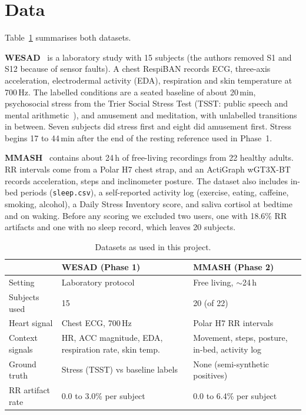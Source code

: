 \documentclass[11pt,a4paper]{article}
\begin{document}
\section{Data}

Table~\ref{tab:data} summarises both datasets.

\textbf{WESAD}~\cite{schmidt2018wesad} is a laboratory study with 15 subjects (the authors removed S1 and S12 because of sensor faults). A chest RespiBAN records ECG, three-axis acceleration, electrodermal activity (EDA), respiration and skin temperature at 700\,Hz. The labelled conditions are a seated baseline of about 20\,min, psychosocial stress from the Trier Social Stress Test (TSST: public speech and mental arithmetic~\cite{kirschbaum1993tsst}), and amusement and meditation, with unlabelled transitions in between. Seven subjects did stress first and eight did amusement first. Stress begins 17 to 44\,min after the end of the resting reference used in Phase~1.

\textbf{MMASH}~\cite{rossi2020mmash,goldberger2000physionet} contains about 24\,h of free-living recordings from 22 healthy adults. RR intervals come from a Polar H7 chest strap, and an ActiGraph wGT3X-BT records acceleration, steps and inclinometer posture. The dataset also includes in-bed periods (\texttt{sleep.csv}), a self-reported activity log (exercise, eating, caffeine, smoking, alcohol), a Daily Stress Inventory score, and saliva cortisol at bedtime and on waking. Before any scoring we excluded two users, one with 18.6\% RR artifacts and one with no sleep record, which leaves 20 subjects.

\begin{table}[t]
  \centering\small
  \caption{Datasets as used in this project.}
  \label{tab:data}
  \begin{tabular}{p{2.7cm}p{6cm}p{6cm}}
    \toprule
    & WESAD (Phase 1) & MMASH (Phase 2) \\
    \midrule
    Setting & Laboratory protocol & Free living, $\sim$24\,h \\
    Subjects used & 15 & 20 (of 22) \\
    Heart signal & Chest ECG, 700\,Hz & Polar H7 RR intervals \\
    Context signals & HR, ACC magnitude, EDA, respiration rate, skin temp. & Movement, steps, posture, in-bed, activity log \\
    Ground truth & Stress (TSST) vs baseline labels & None (semi-synthetic positives) \\
    RR artifact rate & 0.0 to 3.0\% per subject & 0.0 to 6.4\% per subject \\
    \bottomrule
  \end{tabular}
\end{table}
\end{document}
